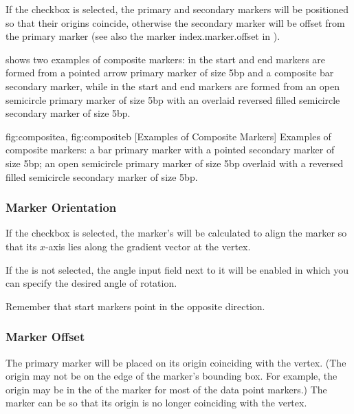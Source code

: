 
If the  \gls*{checkbox}
is selected, the primary and secondary markers will be positioned so
that their origins coincide, otherwise the secondary marker will be
offset from the primary marker (see also the marker
\gls{index.marker.offset} in ). 

 shows two examples of composite markers:
in  the start and end markers are formed
from a pointed arrow primary marker of size 5\gls{bp} and a
composite bar secondary marker, while in 
the start and end markers are formed from an open semicircle primary
marker of size 5bp with an overlaid reversed filled semicircle
secondary marker of size 5bp.

{
 {fig:compositea}{}{},
 {fig:compositeb}{}{}
}
[Examples of Composite Markers]
{Examples of composite markers:
 a bar primary marker with a pointed secondary
marker of size 5bp;
 an open semicircle primary marker of
size 5bp overlaid with a reversed filled semicircle secondary marker
of size 5bp.}


\subsubsection{Marker Orientation}\label{sec:markerorientation}


If the  checkbox is selected,
the marker's  will be
calculated to align the marker so that its $x$-axis lies along the
gradient vector at the vertex. 

If the  is not selected, the angle input
field next to it will be enabled in which you can specify the
desired angle of rotation.

\begin{important}
Remember that start markers point in the opposite direction.
\end{important}

\subsubsection{Marker Offset}\label{sec:markeroffset}

The primary marker will be placed on its origin coinciding with the
vertex. (The origin may not be on the edge of the marker's bounding
box. For example, the origin may be in the  of the
marker for most of the data point markers.)
The marker can be 
so that its origin is no longer coinciding with the vertex.

